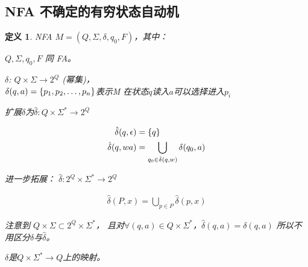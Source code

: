 \documentclass{ctexart}
\newtheorem{definition}{定义}[section]
\DeclarePairedDelimiter{\set}{\{}{\}}
\begin{document}
\subsection{NFA 不确定的有穷状态自动机}
\begin{definition}
    NFA $M = (Q, \Sigma, \delta, q_0, F)$，其中：

    $Q, \Sigma, q_0, F$ 同 FA。

    $\delta$: $Q \times \Sigma \to 2^Q$ (幂集)，\\
    $\delta(q, a) = \set*{p_1, p_2, \dots, p_n}$表示M
    在状态$q$读入$a$可以选择进入$p_i$

    扩展$\delta$为$\hat{\delta}: Q \times \Sigma^* \to 2^Q$
   
    \begin{align*}
            \hat{\delta}(q,\epsilon)  & = \set*{q} \\
            \hat{\delta}(q, wa) & = \bigcup_{q_0 \in \hat{\delta}(q,w)}\delta(q_0, a)
    \end{align*}

    进一步拓展： $\hat{\delta}: 2^Q \times \Sigma^* \to 2^Q$

    \begin{align*}
        \hat{\delta}(P, x) = \bigcup_{p \in P}\hat{\delta}(p, x)
    \end{align*}

    注意到 $Q \times \Sigma \subset 2^Q \times \Sigma^*$，
    且对$\forall (q, a) \in Q \times \Sigma^*$，$\hat{\delta}(q, a) = \delta(q, a)$
    所以不用区分$\delta$与$\hat{\delta}$。 

    $\delta$是$Q \times \Sigma^* \to Q$上的映射。
\end{definition}
\end{document}
